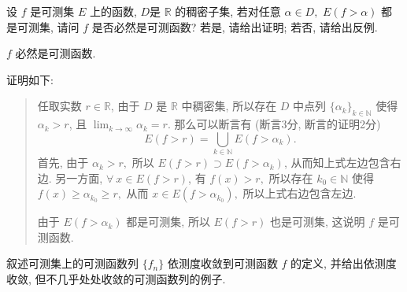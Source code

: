 \begin{question}[points = 10]
  设 $f$ 是可测集 $E$ 上的函数, $D$是 $\mathbb{R}$ 的稠密子集, 若对任意 $\alpha\in D,$ $E(f > \alpha)$ 都是可测集, 请问 $f$ 是否必然是可测函数? 若是, 请给出证明; 若否, 请给出反例.

\end{question}

\begin{solution}
  \(f\) 必然是可测函数. 

  证明如下: 

  \begin{quote}
  任取实数 \(r \in \mathbb{R}\), 由于 \(D\) 是 \(\mathbb{R}\) 中稠密集, 所以存在 \(D\) 中点列 \(\{\alpha_k\}_{k \in \mathbb{N}}\) 使得 \(\alpha_k > r\), 且 \(\displaystyle \lim_{k \to \infty} \alpha_k = r\). 那么可以断言有 (断言3分, 断言的证明2分)
  \[E(f > r) = \bigcup_{k \in \mathbb{N}} E(f > \alpha_k).\]
  首先, 由于 \(\alpha_k > r,\) 所以 \(E(f > r) \supset E(f > \alpha_k)\), 从而知上式左边包含右边. 另一方面, \(\forall ~ x \in E(f > r)\), 有 \(f(x) > r,\) 所以存在 \(k_0 \in \mathbb{N}\) 使得 \(f(x) \geqslant \alpha_{k_0} \geqslant r,\) 从而 \(x \in E(f > \alpha_{k_0}),\) 所以上式右边包含左边.

  由于 \(E(f > \alpha_k)\) 都是可测集, 所以 \(E(f > r)\) 也是可测集, 这说明 \(f\) 是可测函数.
  \end{quote}
\end{solution}

\begin{question}[points = 10]
  叙述可测集上的可测函数列 $\{f_n\}$ 依测度收敛到可测函数 $f$ 的定义, 并给出依测度收敛, 但不几乎处处收敛的可测函数列的例子.

\end{question}

